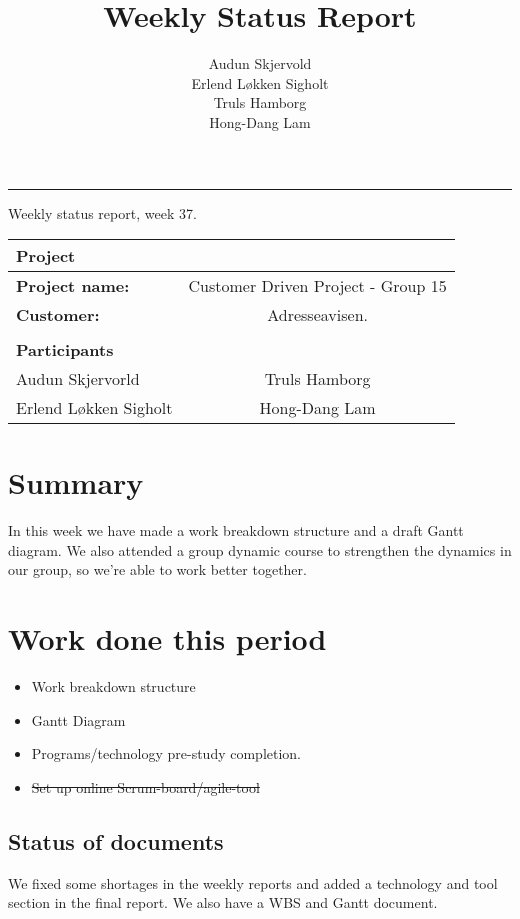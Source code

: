 \documentclass[12pt, a4paper]{article}
\title{Weekly Status Report}
\author{Audun Skjervold \\ Erlend Løkken Sigholt \\ Truls Hamborg \\ Hong-Dang Lam}
\begin{document}
\maketitle
\newpage

 
\newpage
\hrule
\newpage

\begin{center}
Weekly status report, week 37.
  \begin{tabular}{| l  c |}
    \hline
    Project & \\ \hline
    \textbf{Project name:} & Customer Driven Project - Group 15 \\
    \textbf{Customer:} & Adresseavisen. \\ \hline
     & \\
     \textbf{Participants} & \\ \hline
     Audun Skjervorld & Truls Hamborg \\
     Erlend Løkken Sigholt & Hong-Dang Lam \\
    \hline
  \end{tabular}
  \end{center}




\section{Summary}
In this week we have made a work breakdown structure and a draft Gantt diagram. We also attended a group dynamic course to strengthen the dynamics in our group, so we're able to work better together.
\section{Work done this period}
\begin{itemize}
\item  Work breakdown structure
\item  Gantt Diagram
\item  Programs/technology pre-study completion.
\item  \sout{Set up online Scrum-board/agile-tool}
\end{itemize}
\subsection{Status of documents}
We fixed some shortages in the weekly reports and added a technology and tool section in the final report. We also have a WBS and Gantt document.
\end{document}
